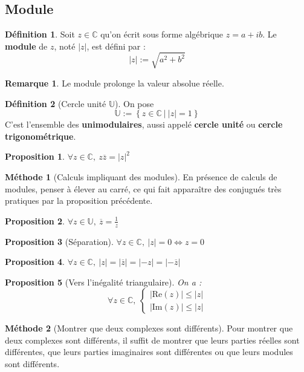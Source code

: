 \documentclass[french]{book}
\newcommand{\C}{\mathbb{C}}
\newcommand{\U}{\mathbb{U}}
\theoremstyle{plain}
\newtheorem{prop}{Proposition}[chapter]
\theoremstyle{definition}
\newtheorem{dfn}{Définition}[chapter]
\newtheorem{rmq}{Remarque}[chapter]
\newtheorem{met}{Méthode}[chapter]
\theoremstyle{remark}
\begin{document}
\subsection{Module}
\begin{dfn}
	Soit $z \in \C$ qu'on écrit sous forme algébrique $z=a+ib$. Le \textbf{module} de $z$, noté $\lvert z\rvert$, est défini par : $$\lvert z\rvert:=\sqrt{a^2+b^2}$$
\end{dfn}
\begin{rmq}
	Le module prolonge la valeur absolue réelle.
\end{rmq}
\begin{dfn}[Cercle unité $\U$]
	On pose $$\U:=\left\{z\in\C\ | \ \lvert z\rvert=1\right\}$$ C'est l'ensemble des \textbf{unimodulaires}, aussi appelé \textbf{cercle unité} ou \textbf{cercle trigonométrique}.
\end{dfn}
\begin{prop}
	$\forall z\in\C,\ z\overline{z}=\lvert z\rvert^2$
\end{prop}
\begin{met}[Calculs impliquant des modules]
	En présence de calculs de modules, penser à élever au carré, ce qui fait apparaître des conjugués très pratiques par la proposition précédente.
\end{met}
\begin{prop}
	$\forall z\in\U,\ \overline{z}=\displaystyle\frac{1}{z}$
\end{prop}
\begin{prop}[Séparation]
	$\forall z\in\C,\ \lvert z\rvert=0\iff z=0$
\end{prop}
\begin{prop}
	$\forall z\in\C,\ \lvert z\rvert=\lvert \overline{z}\rvert=\lvert -z\rvert=\lvert -\overline{z}\rvert$
\end{prop}
\begin{prop}[Vers l'inégalité triangulaire]
	On a : $$\forall z\in\C,\ \begin{cases}
		\left\lvert\text{Re}(z)\right\rvert\leqslant\lvert z\rvert \\
		\left\lvert\text{Im}(z)\right\rvert\leqslant\lvert z\rvert
	\end{cases}$$
\end{prop}
\begin{met}[Montrer que deux complexes sont différents]
	Pour montrer que deux complexes sont différents, il suffit de montrer que leurs parties réelles sont différentes, que leurs parties imaginaires sont différentes ou que leurs modules sont différents.
\end{met}
\end{document}
